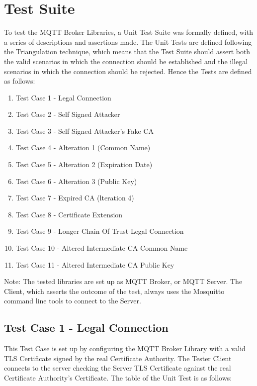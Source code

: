 \documentclass[binding=0.6cm,noexaminfo]{sapthesis}
\begin{document}
\chapter{Test Suite}
To test the MQTT Broker Libraries, a Unit Test Suite was formally defined, with a series of descriptions and assertions made. The Unit Tests are defined following the Triangulation technique, which means that the Test Suite should assert both the valid scenarios in which the connection should be established and the illegal scenarios in which the connection should be rejected. Hence the Tests are defined as follows:
\begin{enumerate}
	\item Test Case 1 - Legal Connection
	\item Test Case 2 - Self Signed Attacker
	\item Test Case 3 - Self Signed Attacker's Fake CA
	\item Test Case 4 - Alteration 1 (Common Name)
	\item Test Case 5 - Alteration 2 (Expiration Date)
	\item Test Case 6 - Alteration 3 (Public Key)
	\item Test Case 7 - Expired CA (lteration 4)
	\item Test Case 8 - Certificate Extension
	\item Test Case 9 - Longer Chain Of Trust Legal Connection
	\item Test Case 10 - Altered Intermediate CA Common Name
	\item Test Case 11 - Altered Intermediate CA Public Key
\end{enumerate}
Note: The tested libraries are set up as MQTT Broker, or MQTT Server. The Client, which asserts the outcome of the test, always uses the Mosquitto command line tools to connect to the Server.

\section{Test Case 1 - Legal Connection}
This Test Case is set up by configuring the MQTT Broker Library with a valid TLS Certificate signed by the real Certificate Authority. The Tester Client connects to the server checking the Server TLS Certificate against the real Certificate Authority’s Certificate. The table of the Unit Test is as follows:
\end{document}
